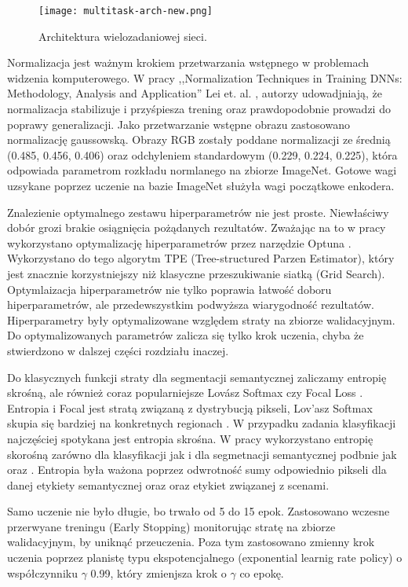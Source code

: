 \begin{figure}[ht!]
\centering
\texttt{[image: multitask-arch-new.png]}
\caption{Architektura wielozadaniowej sieci.}
\label{fig:multitask}
\end{figure}

Normalizacja jest ważnym krokiem przetwarzania wstępnego w problemach widzenia komputerowego. W pracy ,,Normalization Techniques in Training DNNs: Methodology, Analysis and Application'' Lei et. al. \cite{huang2020normalization}, autorzy udowadjniają, że normalizacja stabilizuje i przyśpiesza trening oraz prawdopodobnie prowadzi do poprawy generalizacji. Jako przetwarzanie wstępne obrazu zastosowano normalizację gaussowską. Obrazy RGB zostały poddane normalizacji ze średnią (0.485, 0.456, 0.406) oraz odchyleniem standardowym (0.229, 0.224, 0.225), która odpowiada parametrom rozkładu normlanego na zbiorze ImageNet. Gotowe wagi uzsykane poprzez uczenie na bazie ImageNet służyła wagi początkowe enkodera.

Znalezienie optymalnego zestawu hiperparametrów nie jest proste. Niewłaściwy dobór grozi brakie osiągnięcia pożądanych rezultatów. Zważając na to w pracy wykorzystano optymalizację hiperparametrów przez narzędzie Optuna \cite{optuna_2019}. Wykorzystano do tego algorytm TPE (Tree-structured Parzen Estimator), który jest znacznie korzystniejszy niż klasyczne przeszukiwanie siatką (Grid Search). Optymlaizacja hiperparametrów nie tylko poprawia łatwość doboru hiperparametrów, ale przedewszystkim podwyższa wiarygodność rezultatów. Hiperparametry były optymalizowane względem straty na zbiorze walidacyjnym. Do optymalizowanych parametrów zalicza się tylko krok uczenia, chyba że stwierdzono w dalszej części rozdziału inaczej.

Do klasycznych funkcji straty dla segmentacji semantycznej zaliczamy entropię skrośną, ale również coraz popularniejsze Lov\'asz Softmax \cite{berman2018lovasz} czy Focal Loss \cite{jadon2020survey}. Entropia i Focal jest stratą związaną z dystrybucją pikseli, Lov'asz Softmax skupia się bardziej na konkretnych regionach \cite{jadon2020survey}. W przypadku zadania klasyfikacji najczęściej spotykana jest entropia skrośna. W pracy wykorzystano entropię skorośną zarówno dla klasyfikacji jak i dla segmetnacji semantycznej podbnie jak \cite{mehta2018net} oraz \cite{9892852}. Entropia była ważona poprzez odwrotność sumy odpowiednio pikseli dla danej etykiety semantycznej oraz oraz etykiet związanej z scenami.

Samo uczenie nie było długie, bo trwało od 5 do 15 epok. Zastosowano wczesne przerwyane treningu (Early Stopping) monitorując stratę na zbiorze walidacyjnym, by uniknąć przeuczenia. Poza tym zastosowano zmienny krok uczenia poprzez planistę typu ekspotencjalnego (exponential learnig rate policy) o współczynniku $\gamma$ 0.99, który zmienjsza krok o $\gamma$ co epokę.

